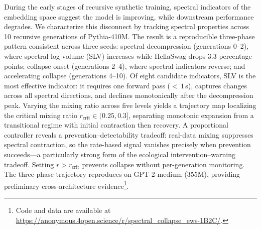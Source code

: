 During the early stages of recursive synthetic training, spectral indicators of the embedding space suggest the model is improving, while downstream performance degrades.
We characterize this disconnect by tracking spectral properties across 10 recursive generations of Pythia-410M.
The result is a reproducible three-phase pattern consistent across three seeds: spectral decompression (generations 0--2), where spectral log-volume (SLV) increases while HellaSwag drops 3.3 percentage points; collapse onset (generations 2--4), where spectral indicators reverse; and accelerating collapse (generations 4--10).
Of eight candidate indicators, SLV is the most effective indicator: it requires one forward pass (${<}\,1$\,s), captures changes across all spectral directions, and declines monotonically after the decompression peak.
Varying the mixing ratio across five levels yields a trajectory map localizing the critical mixing ratio $r_{\text{crit}} \in (0.25, 0.3]$, separating monotonic expansion from a transitional regime with initial contraction then recovery.
A proportional controller reveals a prevention--detectability tradeoff: real-data mixing suppresses spectral contraction, so the rate-based signal vanishes precisely when prevention succeeds---a particularly strong form of the ecological intervention--warning tradeoff.
Setting $r > r_{\text{crit}}$ prevents collapse without per-generation monitoring.
The three-phase trajectory reproduces on GPT-2-medium (355M), providing preliminary cross-architecture evidence\footnote{Code and data are available at \url{https://anonymous.4open.science/r/spectral_collapse_ews-1B2C/}.}.
